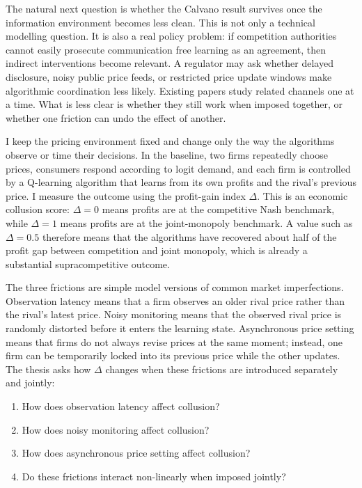 The natural next question is whether the Calvano result survives once the information environment becomes less clean. This is not only a technical modelling question. It is also a real policy problem: if competition authorities cannot easily prosecute communication free learning as an agreement, then indirect interventions become relevant. A regulator may ask whether delayed disclosure, noisy public price feeds, or restricted price update windows make algorithmic coordination less likely. Existing papers study related channels one at a time. What is less clear is whether they still work when imposed together, or whether one friction can undo the effect of another.

I keep the \citet{calvano2020} pricing environment fixed and change only the way the algorithms observe or time their decisions. In the baseline, two firms repeatedly choose prices, consumers respond according to logit demand, and each firm is controlled by a Q-learning algorithm that learns from its own profits and the rival's previous price. I measure the outcome using the profit-gain index $\Delta$. This is an economic collusion score: $\Delta=0$ means profits are at the competitive Nash benchmark, while $\Delta=1$ means profits are at the joint-monopoly benchmark. A value such as $\Delta=0.5$ therefore means that the algorithms have recovered about half of the profit gap between competition and joint monopoly, which is already a substantial supracompetitive outcome.

The three frictions are simple model versions of common market imperfections. Observation latency means that a firm observes an older rival price rather than the rival's latest price. Noisy monitoring means that the observed rival price is randomly distorted before it enters the learning state. Asynchronous price setting means that firms do not always revise prices at the same moment; instead, one firm can be temporarily locked into its previous price while the other updates. The thesis asks how $\Delta$ changes when these frictions are introduced separately and jointly:
\begin{enumerate}[label=\textbf{RQ\arabic*.}, leftmargin=3em, labelsep=0.6em, itemsep=5pt, parsep=0pt, topsep=10pt, partopsep=3pt]
    \item How does observation latency affect collusion?
    \item How does noisy monitoring affect collusion?
    \item How does asynchronous price setting affect collusion?
    \item Do these frictions interact non-linearly when imposed jointly?
\end{enumerate}

